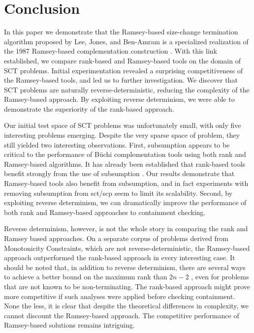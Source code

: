 \documentclass{LMCS}
\newcommand\buchi{B\"uchi }
\begin{document}
\section{Conclusion}\label{Sect:Conclusion}
In this paper we demonstrate that the Ramsey-based size-change
termination algorithm proposed by Lee, Jones, and Ben-Amram \cite{LJB01} is a
specialized realization of the 1987 Ramsey-based complementation construction
\cite{Buc62,SVW85}.  With this link established, we compare rank-based and
Ramsey-based tools on the domain of SCT problems. Initial experimentation
revealed a surprising competitiveness of the Ramsey-based tools, and led us to
further investigation. We discover that SCT problems are naturally
reverse-deterministic, reducing the complexity of the Ramsey-based approach. By
exploiting reverse determinism, we were able to demonstrate the superiority of
the rank-based approach.

Our initial test space of SCT problems was unfortunately small, with only five
interesting problems emerging. Despite the very sparse space of problem, they
still yielded two interesting observations. First, subsumption appears to be
critical to the performance of \buchi complementation tools using both rank and
Ramsey-based algorithms. It has already been established that rank-based tools
benefit strongly from the use of subsumption \cite{DR07}. Our results
demonstrate that Ramsey-based tools also benefit from subsumption, and in fact
experiments with removing subsumption from sct/scp seem to limit its
scalability. Second, by exploiting reverse determinism, we can dramatically
improve the performance of both rank and Ramsey-based approaches to containment
checking.

Reverse determinism, however, is not the whole story in comparing the rank and
Ramsey based approaches. On a separate corpus of problems derived from Monotonicity Constraints,
which are not reverse-deterministic, the Ramsey-based approach outperformed the rank-based
approach in every interesting case. It should be noted that, in addition to
reverse determinism, there are several ways to achieve a better bound on the
maximum rank than $2n-2$ \cite{FKV04, GKSV03}, even for problems that are not
known to be non-terminating. The rank-based approach might prove more competitive if such analyses
were applied before checking containment. None the less, it is clear that despite the theoretical
differences in complexity, we cannot discount the Ramsey-based approach. The competitive performance
of Ramsey-based solutions remains intriguing. 
\end{document}
